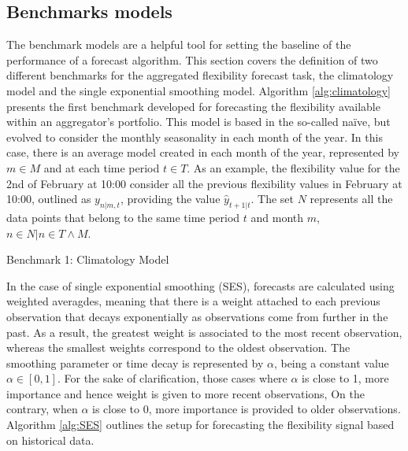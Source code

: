 \subsection{Benchmarks models}

The benchmark models are a helpful tool for setting the baseline of the performance of a forecast algorithm. This section covers the definition of two different benchmarks for the aggregated flexibility forecast task, the climatology model and the single exponential smoothing model. Algorithm \ref{alg:climatology} presents the first benchmark developed for forecasting the flexibility available within an aggregator's portfolio. This model is based in the so-called na\"{i}ve, but evolved to consider the monthly seasonality in each month of the year. In this case, there is an average model created in each month of the year, represented by $m \in M$ and at each time period $t \in T$. As an example, the flexibility value for the 2nd of February at 10:00 consider all the previous flexibility values in February at 10:00, outlined as $y_{n|m,t}$,  providing the value $\hat{y}_{t+1|t}$. The set $N$ represents all the data points that belong to the same time period $t$ and month $m$, $n \in N | n \in  T \wedge M$. 

\begin{algorithm}
	\SetAlgoLined
	\caption{Benchmark 1: Climatology Model}
	\label{alg:climatology}
\end{algorithm}

In the case of single exponential smoothing (SES), forecasts are calculated using weighted averagdes, meaning that there is a weight attached to each previous observation that decays exponentially as observations come from further in the past. As a result, the greatest weight is associated to the most recent observation, whereas the smallest weights correspond to the oldest observation. The smoothing parameter or time decay is represented by $\alpha$, being a constant value $\alpha \in [0,1]$. For the sake of clarification, those cases where $\alpha$ is close to 1, more importance and hence weight is given to more recent observations, On the contrary, when $\alpha$ is close to 0, more importance is provided to older observations. Algorithm \ref{alg:SES} outlines the setup for forecasting the flexibility signal based on historical data. 


